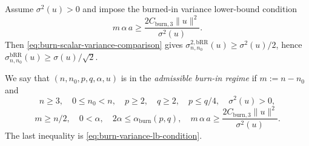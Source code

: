 Assume $\sigma^{2}(u) > 0$ and impose the burned-in variance lower-bound condition
\begin{equation}
m \, \alpha \, a
  \ge \frac{2 C_{\mathrm{burn,3}} \lVert u \rVert^{2}}{\sigma^{2}(u)}.
\label{eq:burn-variance-lb-condition}
\end{equation}
Then \eqref{eq:burn-scalar-variance-comparison} gives
$\sigma_{n,n_{0}}^{2, \mathrm{bRR}}(u) \ge \sigma^{2}(u) / 2$, hence
$\sigma_{n,n_{0}}^{\mathrm{bRR}}(u) \ge \sigma(u) / \sqrt{2}$.

We say that $(n,n_{0},p,q,\alpha,u)$ is in the \emph{admissible burn-in regime} if
$m := n - n_{0}$ and
\[
n \ge 3,
\quad
0 \le n_{0} < n,
\quad
p \ge 2,
\quad
q \ge 2,
\quad
p \le q / 4,
\quad
\sigma^{2}(u) > 0,
\]
\begin{equation}
m \ge n / 2,
\quad
0 < \alpha,
\quad
2 \alpha \le \alpha_{\mathrm{burn}}(p,q),
\quad
m \, \alpha \, a
  \ge \frac{2 C_{\mathrm{burn,3}} \lVert u \rVert^{2}}{\sigma^{2}(u)}.
\label{eq:admissible-burn-regime}
\end{equation}
The last inequality is \eqref{eq:burn-variance-lb-condition}.
